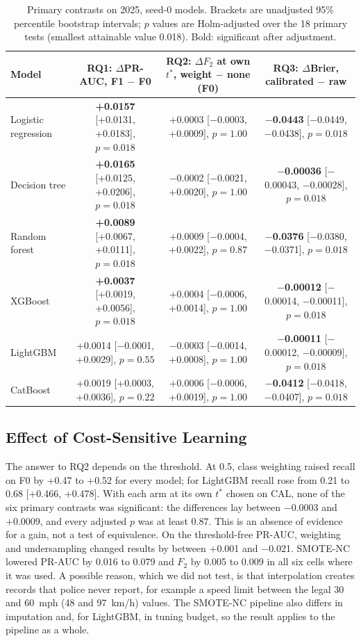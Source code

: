 \documentclass[conference,letterpaper]{IEEEtran}
\begin{document}
\begin{table}[t]
\centering
\caption{Primary contrasts on 2025, seed-0 models. Brackets are unadjusted 95\% percentile bootstrap intervals; $p$ values are Holm-adjusted over the 18 primary tests (smallest attainable value 0.018). Bold: significant after adjustment.}
\label{tab:primary}
\setlength{\tabcolsep}{4pt}
\begin{tabular}{@{}lccc@{}}
\toprule
Model & RQ1: $\Delta$PR-AUC, F1 $-$ F0 & RQ2: $\Delta F_2$ at own $t^{*}$, weight $-$ none (F0) & RQ3: $\Delta$Brier, calibrated $-$ raw \\
\midrule
Logistic regression & \textbf{+0.0157} [+0.0131, +0.0183], $p=0.018$ & +0.0003 [$-$0.0003, +0.0009], $p=1.00$ & \textbf{$-$0.0443} [$-$0.0449, $-$0.0438], $p=0.018$ \\
Decision tree & \textbf{+0.0165} [+0.0125, +0.0206], $p=0.018$ & $-$0.0002 [$-$0.0021, +0.0020], $p=1.00$ & \textbf{$-$0.00036} [$-$0.00043, $-$0.00028], $p=0.018$ \\
Random forest & \textbf{+0.0089} [+0.0067, +0.0111], $p=0.018$ & +0.0009 [$-$0.0004, +0.0022], $p=0.87$ & \textbf{$-$0.0376} [$-$0.0380, $-$0.0371], $p=0.018$ \\
XGBoost & \textbf{+0.0037} [+0.0019, +0.0056], $p=0.018$ & +0.0004 [$-$0.0006, +0.0014], $p=1.00$ & \textbf{$-$0.00012} [$-$0.00014, $-$0.00011], $p=0.018$ \\
LightGBM & +0.0014 [$-$0.0001, +0.0029], $p=0.55$ & $-$0.0003 [$-$0.0014, +0.0008], $p=1.00$ & \textbf{$-$0.00011} [$-$0.00012, $-$0.00009], $p=0.018$ \\
CatBoost & +0.0019 [+0.0003, +0.0036], $p=0.22$ & +0.0006 [$-$0.0006, +0.0019], $p=1.00$ & \textbf{$-$0.0412} [$-$0.0418, $-$0.0407], $p=0.018$ \\
\bottomrule
\end{tabular}
\end{table}

\subsection{Effect of Cost-Sensitive Learning}
\label{sec:rq2}

The answer to RQ2 depends on the threshold. At 0.5, class weighting raised recall on F0 by +0.47 to +0.52 for every model; for LightGBM recall rose from 0.21 to 0.68 [+0.466, +0.478]. With each arm at its own $t^{*}$ chosen on CAL, none of the six primary contrasts was significant: the differences lay between $-0.0003$ and $+0.0009$, and every adjusted $p$ was at least 0.87. This is an absence of evidence for a gain, not a test of equivalence. On the threshold-free PR-AUC, weighting and undersampling changed results by between +0.001 and $-$0.021. SMOTE-NC lowered PR-AUC by 0.016 to 0.079 and $F_2$ by 0.005 to 0.009 in all six cells where it was used. A possible reason, which we did not test, is that interpolation creates records that police never report, for example a speed limit between the legal 30 and 60~mph (48 and 97~km/h) values. The SMOTE-NC pipeline also differs in imputation and, for LightGBM, in tuning budget, so the result applies to the pipeline as a whole.
\end{document}

